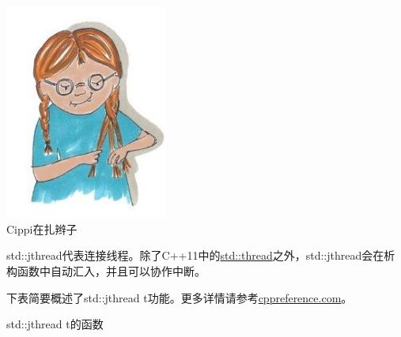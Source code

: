 \begin{center}
\includegraphics[width=0.4\textwidth]{content/3/chapter6/images/24.png}\\
Cippi在扎辫子
\end{center}

std::jthread代表连接线程。除了C++11中的\href{https://en.cppreference.com/w/cpp/thread/thread}{std::thread}之外，std::jthread会在析构函数中自动汇入，并且可以协作中断。

下表简要概述了std::jthread t功能。更多详情请参考\href{https://en.cppreference.com/w/cpp/thread/jthread}{cppreference.com}。

\begin{center}
std::jthread t的函数
\end{center}

